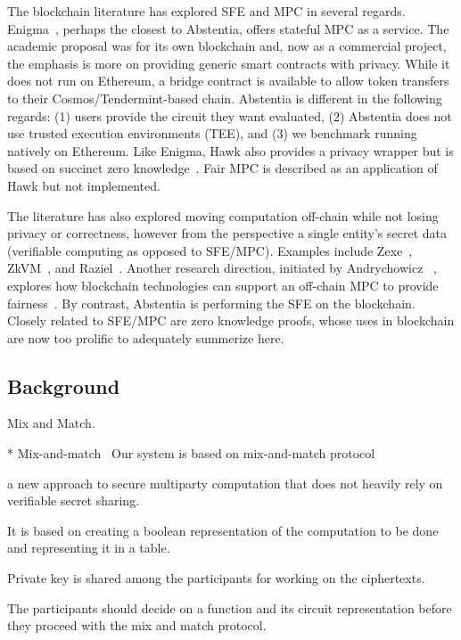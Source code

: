 The blockchain literature has explored SFE and MPC in several regards. Enigma~\cite{zyskind2015enigma}, perhaps the closest to Abstentia, offers stateful MPC as a service. The academic proposal was for its own blockchain and, now as a commercial project, the emphasis is more on providing generic smart contracts with privacy. While it does not run on Ethereum, a bridge contract is available to allow token transfers to their Cosmos/Tendermint-based chain. Abstentia is different in the following regards: (1) users provide the circuit they want evaluated, (2) Abstentia does not use trusted execution environments (TEE), and (3) we benchmark running natively on Ethereum. Like Enigma, Hawk also provides a privacy wrapper but is based on succinct zero knowledge~\cite{kosba2016hawk}. Fair MPC is described as an application of Hawk but not implemented.  


The literature has also explored moving computation off-chain while not losing privacy or correctness, however from the perspective a single entity's secret data (\ie verifiable computing as opposed to SFE/MPC). Examples include Zexe~\cite{bowe2020zexe}, ZkVM~\cite{zkvm}, and Raziel~\cite{sanchez2018raziel}. Another research direction, initiated by Andrychowicz \etal~\cite{andrychowicz2014secure}, explores how blockchain technologies can support an off-chain MPC to provide fairness~\cite{kuma}. By contrast, Abstentia is performing the SFE on the blockchain. Closely related to SFE/MPC are zero knowledge proofs, whose uses in blockchain are now too prolific to adequately summerize here.

\subsection{Background}

Mix and Match.

* Mix-and-match~\cite{jakobsson2000mix}
Our system is based on mix-and-match protocol

a new approach to secure multiparty computation that does not heavily rely on verifiable secret sharing. 

It is based on creating a boolean representation of the computation to be done and representing it in a table. 

Private key is shared among the participants for working on the ciphertexts. 

The participants should decide on a function and its circuit representation before they proceed with the mix and match protocol.

